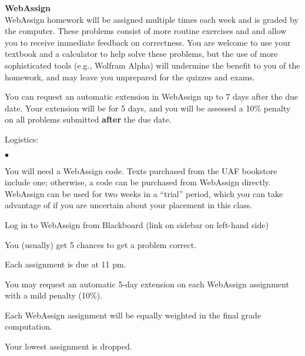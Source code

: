 \documentclass[12pt]{article}
\renewcommand{\emph}[1]{\textsf{\textbf{#1}}}
\newcommand{\localhead}[1]{\par\smallskip\textbf{#1}\nobreak\\}%
\def\subheading#1{\localhead{\emph{#1}}}
\newenvironment{clist}%
{\bgroup\parskip 0pt\begin{list}{$\bullet$}{\partopsep 4pt\topsep 0pt\itemsep -2pt}}%
{\end{list}\egroup}%
\begin{document}
%

\subheading{WebAssign} 
WebAssign homework will be assigned multiple times each week and is graded by the computer. These problems consist of more routine exercises and and allow
you to receive immediate feedback on correctness. %
You are welcome
to use your textbook and a calculator to help solve these problems, but
the use of more sophisticated tools (e.g., Wolfram Alpha) will undermine
the benefit to you of the homework, and may leave you unprepared for
the quizzes and exams.

You can request an automatic extension in WebAssign up to 7 days after the due date. Your extension will be for 5 days, and you will be assessed a 10\% penalty on all problems submitted \emph{after} the due date.


Logistics:

\begin{clist}
\item You will need a WebAssign code.  Texts purchased from the UAF 
bookstore include one; otherwise, a code can be purchased from
WebAssign directly. WebAssign can be used for two weeks in a ``trial''
period, which you can take advantage of if you are uncertain about
your placement in this class.
\item Log in to WebAssign from Blackboard (link on sidebar on left-hand side)
\item You (usually) get 5 chances to get a problem correct. 
\item Each assignment is due at 11 pm. 
\item You may request an automatic 5-day extension on each WebAssign assignment with a mild penalty (10\%).%
\item Each WebAssign assignment will be equally weighted in the final grade computation. 
\item Your lowest assignment is dropped.
\end{clist}
\end{document}
